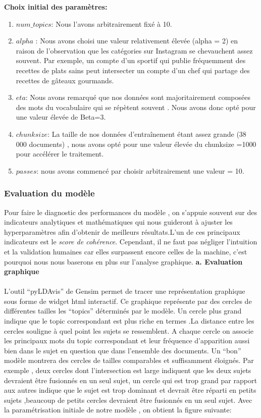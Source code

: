 \documentclass[12pt]{extarticle}
\begin{document}
\textbf{Choix initial des paramètres:}
\begin{enumerate}
\item $num\_topics$:  Nous l’avons arbitrairement fixé à 10.
 \item $alpha$ : Nous avons choisi une valeur relativement élevée (alpha = 2) en raison de l'observation que les catégories sur Instagram se chevauchent assez souvent. Par exemple, un compte d'un sportif qui publie fréquemment des recettes de plats sains peut intersecter un compte d'un chef qui partage des recettes de gâteaux gourmands.
\item $eta$:  Nous avons remarqué que nos données   sont majoritairement composées des mots du vocabulaire qui se répètent souvent . Nous avons donc opté pour une valeur élevée de Beta=3.
\item $chunksize$: La taille de nos données d’entraînement étant assez grande (38 000 documents) , nous avons opté pour une valeur élevée du  chunksize =1000 pour accélérer le traitement.
\item $passes$: nous avons commencé par choisir arbitrairement une valeur = 10.
\end{enumerate}

\subsubsection{Evaluation du modèle}
Pour faire le  diagnostic des performances du modèle , on s'appuie souvent sur des indicateurs analytiques et mathématiques qui nous guideront à ajuster les hyperparamètres afin d’obtenir de meilleurs résultats.L’un de ces  principaux indicateurs est  le \textit{score de cohérence}. Cependant, il ne faut pas négliger l'intuition et la validation humaines car elles surpassent encore celles de la machine, c’est  pourquoi nous nous baserons en plus sur l’analyse graphique. \clearpage
\textbf{a. Evaluation graphique } \\ \\
L’outil “pyLDAvis” de Gensim permet de tracer une représentation graphique sous forme de widget html interactif. Ce graphique représente par des cercles de différentes tailles   les “topics” déterminés par le modèle. Un cercle plus grand indique que le topic correspondant est plus riche en termes .La distance entre les cercles souligne à quel point les sujets se ressemblent.
A chaque cercle on associe les  principaux mots du topic correspondant et leur fréquence d’apparition aussi bien dans le sujet en question que dans l’ensemble des documents.
Un “bon” modèle montrera des cercles de tailles comparables et  suffisamment éloignés. Par exemple , deux cercles dont l’intersection est large indiquent que les deux sujets  devraient être fusionnés en un seul sujet, un cercle qui est trop grand par rapport aux autres indique que le sujet est trop dominant et devrait être réparti en petits sujets ,beaucoup de petits cercles devraient être fusionnés en un seul sujet.
Avec la paramétrisation  initiale de notre modèle , on obtient la figure suivante:
\end{document}
